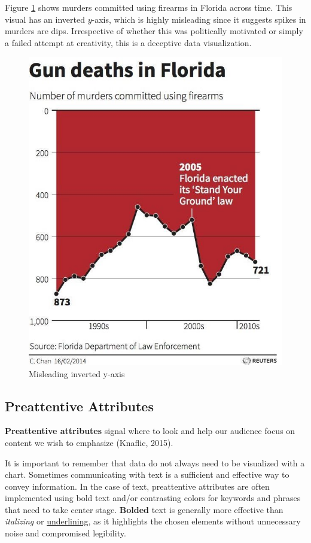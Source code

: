 \documentclass[
]{book}
\begin{document}
Figure \ref{fig:flipped-axis-viz} shows murders committed using firearms in Florida across time. This visual has an inverted \(y\)-axis, which is highly misleading since it suggests spikes in murders are dips. Irrespective of whether this was politically motivated or simply a failed attempt at creativity, this is a deceptive data visualization.

\begin{figure}

{\centering \includegraphics[width=0.75\linewidth]{graphics/bad_viz-flipped_y_axis} 

}

\caption{Misleading inverted y-axis}\label{fig:flipped-axis-viz}
\end{figure}

\hypertarget{preattentive-attributes}{%
\subsection{Preattentive Attributes}\label{preattentive-attributes}}

\textbf{Preattentive attributes} signal where to look and help our audience focus on content we wish to emphasize (Knaflic, 2015).

It is important to remember that data do not always need to be visualized with a chart. Sometimes communicating with text is a sufficient and effective way to convey information. In the case of text, preattentive attributes are often implemented using bold text and/or contrasting colors for keywords and phrases that need to take center stage. \textbf{Bolded} text is generally more effective than \emph{italizing} or \underline{underlining}, as it highlights the chosen elements without unnecessary noise and compromised legibility.
\end{document}
